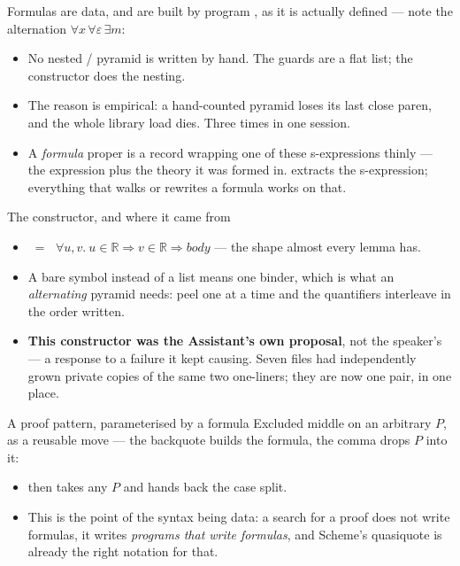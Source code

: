 \documentclass[11pt,aspectratio=169]{beamer}
\begin{document}
\begin{frame}[fragile]{Formulas are data, and are built by program}
  , as it is actually defined --- note the alternation
  $\forall x\, \forall \varepsilon\, \exists m$:
  \begin{itemize}\small
    \item No nested / pyramid is written by hand. The
          guards are a flat list; the constructor does the nesting.
    \item The reason is empirical: a hand-counted pyramid loses its last close
          paren, and the whole library load dies. Three times in one session.
    \item A \emph{formula} proper is a record wrapping one of these s-expressions
          thinly --- the expression plus the theory it was formed in.
           extracts the s-expression; everything that
          walks or rewrites a formula works on that.
  \end{itemize}
\end{frame}

\begin{frame}[fragile]{The constructor, and where it came from}
  \begin{itemize}\small
    \item {}
          $\;=\;$ $\forall u,v.\ u \in \mathbb{R} \Rightarrow v \in \mathbb{R}
          \Rightarrow \textit{body}$ --- the shape almost every lemma has.
    \item A bare symbol instead of a list means one binder, which is what an
          \emph{alternating} pyramid needs: peel one at a time and the
          quantifiers interleave in the order written.
    \item \textbf{This constructor was the Assistant's own proposal}, not the
          speaker's --- a response to a failure it kept causing. Seven files
          had independently grown private copies of the same two one-liners;
          they are now one pair, in one place.
  \end{itemize}
\end{frame}

\begin{frame}[fragile]{A proof pattern, parameterised by a formula}
  Excluded middle on an arbitrary $P$, as a reusable move --- the backquote
  builds the formula, the comma drops $P$ into it:
  \begin{itemize}\small
    \item {} then takes any $P$ and hands back the case split.
    \item This is the point of the syntax being data: a search for a proof does
          not write formulas, it writes \emph{programs that write formulas},
          and Scheme's quasiquote is already the right notation for that.
  \end{itemize}
\end{frame}
\end{document}

